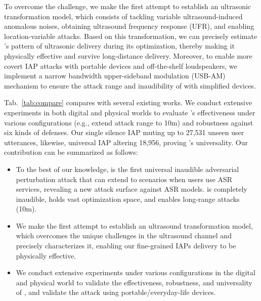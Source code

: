 To overcome the challenge, we make the first attempt to establish an ultrasonic transformation model, which consists of tackling variable ultrasound-induced anomalous noises, obtaining ultrasound frequency response (UFR), and enabling location-variable attacks. 
Based on this transformation, we can precisely estimate \alias's pattern of ultrasonic delivery during its optimization, thereby making it physically effective and survive long-distance delivery. Moreover, to enable more covert IAP attacks with portable devices and off-the-shelf loudspeakers, we implement a narrow bandwidth upper-sideband modulation (USB-AM) mechanism to ensure the attack range and inaudibility of \alias with simplified devices.

Tab.~\ref{tab:compare} compares \alias with several existing works. 
We conduct extensive experiments in both digital and physical worlds to evaluate \alias's effectiveness under various configurations (e.g., extend attack range to 10m) and robustness against six kinds of defenses. Our single silence IAP muting up to 27,531 unseen user utterances, likewise, universal IAP altering 18,956, proving \alias's universality. 
Our contribution can be summarized as follows:

\begin{itemize}[leftmargin=*]
    \item To the best of our knowledge, \alias is the first universal inaudible adversarial perturbation attack that can extend to scenarios when users use ASR services, revealing a new attack surface against ASR models. \alias is completely inaudible, holds vast optimization space, and enables long-range attacks (10m).
    \item We make the first attempt to establish an ultrasound transformation model, which overcomes the unique challenges in the ultrasound channel and precisely characterizes it, enabling our fine-grained IAPs delivery to be physically effective.
    \item We conduct extensive experiments under various configurations in the digital and physical world to validate the effectiveness, robustness, and universality of \alias, and validate the attack using portable/everyday-life devices.
    
\end{itemize}
